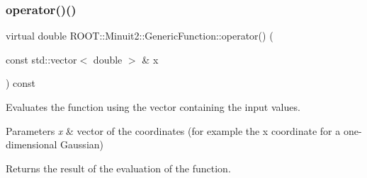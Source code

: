 \mbox{\label{classROOT_1_1Minuit2_1_1GenericFunction_a0d6039ad9aa18e475534d1fd80342e9d}} 
\subsubsection{\texorpdfstring{operator()()}{operator()()}\hspace{0.1cm}{\footnotesize\ttfamily [3/3]}}
{\footnotesize\ttfamily virtual double R\+O\+O\+T\+::\+Minuit2\+::\+Generic\+Function\+::operator() (\begin{DoxyParamCaption}\item[{const std\+::vector$<$ double $>$ \&}]{x }\end{DoxyParamCaption}) const\hspace{0.3cm}{\ttfamily [pure virtual]}}

Evaluates the function using the vector containing the input values.


\begin{DoxyParams}{Parameters}
{\em x} & vector of the coordinates (for example the x coordinate for a one-\/dimensional Gaussian)\\
\hline
\end{DoxyParams}
\begin{DoxyReturn}{Returns}
the result of the evaluation of the function. 
\end{DoxyReturn}


